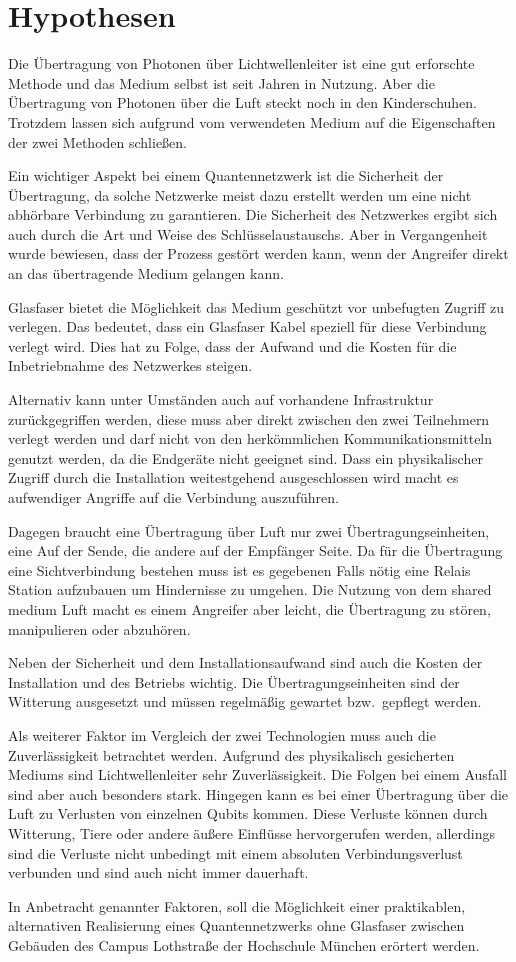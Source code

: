 \chapter{Hypothesen}

Die Übertragung von Photonen über Lichtwellenleiter ist eine gut erforschte Methode und das Medium selbst ist seit Jahren in Nutzung.
Aber die Übertragung von Photonen über die Luft steckt noch in den Kinderschuhen.
Trotzdem lassen sich aufgrund vom verwendeten Medium auf die Eigenschaften der zwei Methoden schließen.

Ein wichtiger Aspekt bei einem Quantennetzwerk ist die Sicherheit der Übertragung, da solche Netzwerke meist dazu erstellt werden um eine nicht abhörbare Verbindung zu garantieren.
Die Sicherheit des Netzwerkes ergibt sich auch durch die Art und Weise des Schlüsselaustauschs.
Aber in Vergangenheit wurde bewiesen, dass der Prozess gestört werden kann, wenn der Angreifer direkt an das übertragende Medium gelangen kann\cite{Fei2018QuantumMA}.

Glasfaser bietet die Möglichkeit das Medium geschützt vor unbefugten Zugriff zu verlegen.
Das bedeutet, dass ein Glasfaser Kabel speziell für diese Verbindung verlegt wird.
Dies hat zu Folge, dass der Aufwand und die Kosten für die Inbetriebnahme des Netzwerkes steigen.

Alternativ kann unter Umständen auch auf vorhandene Infrastruktur zurückgegriffen werden, diese muss aber direkt zwischen den zwei Teilnehmern verlegt werden und darf nicht von den herkömmlichen Kommunikationsmitteln genutzt werden, da die Endgeräte nicht geeignet sind.
Dass ein physikalischer Zugriff durch die Installation weitestgehend ausgeschlossen wird macht es aufwendiger Angriffe auf die Verbindung auszuführen.

Dagegen braucht eine Übertragung über Luft nur zwei Übertragungseinheiten, eine Auf der Sende, die andere auf der Empfänger Seite.
Da für die Übertragung eine Sichtverbindung bestehen muss ist es gegebenen Falls nötig eine Relais Station aufzubauen um Hindernisse zu umgehen.
Die Nutzung von dem shared medium Luft macht es einem Angreifer aber leicht, die Übertragung zu stören, manipulieren oder abzuhören.

Neben der Sicherheit und dem Installationsaufwand sind auch die Kosten der Installation und des Betriebs wichtig.
Die Übertragungseinheiten sind der Witterung ausgesetzt und müssen regelmäßig gewartet bzw.~gepflegt werden.

Als weiterer Faktor im Vergleich der zwei Technologien muss auch die Zuverlässigkeit betrachtet werden.
Aufgrund des physikalisch gesicherten Mediums sind Lichtwellenleiter sehr Zuverlässigkeit.
Die Folgen bei einem Ausfall sind aber auch besonders stark.
Hingegen kann es bei einer Übertragung über die Luft zu Verlusten von einzelnen Qubits kommen.
Diese Verluste können durch Witterung, Tiere oder andere äußere Einflüsse hervorgerufen werden, allerdings sind die Verluste nicht unbedingt mit einem absoluten Verbindungsverlust verbunden und sind auch nicht immer dauerhaft.

In Anbetracht genannter Faktoren, soll die Möglichkeit einer praktikablen, alternativen Realisierung eines Quantennetzwerks ohne Glasfaser zwischen Gebäuden des Campus Lothstraße der Hochschule München erörtert werden.

